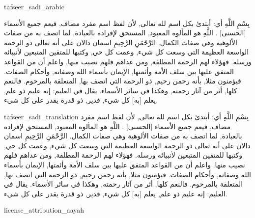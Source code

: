 \begin{taggedblock}{tafseer_sadi_arabic}
\begin{Arabic}
{ بِسْمِ اللَّهِ }
أي: أبتدئ بكل اسم لله تعالى, لأن لفظ
{ اسم }
مفرد مضاف, فيعم جميع الأسماء
[الحسنى]
.
{ اللَّهِ }
هو المألوه المعبود, المستحق لإفراده بالعبادة, لما اتصف به من صفات الألوهية وهي صفات الكمال.
{ الرَّحْمَنِ الرَّحِيمِ }
اسمان دالان على أنه تعالى ذو الرحمة الواسعة العظيمة التي وسعت كل شيء, وعمت كل حي, وكتبها للمتقين المتبعين لأنبيائه ورسله. فهؤلاء لهم الرحمة المطلقة, ومن عداهم فلهم نصيب منها. واعلم أن من القواعد المتفق عليها بين سلف الأمة وأئمتها, الإيمان بأسماء الله وصفاته, وأحكام الصفات. فيؤمنون مثلا, بأنه رحمن رحيم, ذو الرحمة التي اتصف بها, المتعلقة بالمرحوم. فالنعم كلها, أثر من آثار رحمته, وهكذا في سائر الأسماء. يقال في العليم: إنه عليم ذو علم, يعلم
[به]
كل شيء, قدير, ذو قدرة يقدر على كل شيء.
\end{Arabic}
\end{taggedblock}
\begin{taggedblock}{tafseer_sadi_translation}
{ بِسْمِ اللَّهِ }
أي: أبتدئ بكل اسم لله تعالى, لأن لفظ
{ اسم }
مفرد مضاف, فيعم جميع الأسماء
[الحسنى]
.
{ اللَّهِ }
هو المألوه المعبود, المستحق لإفراده بالعبادة, لما اتصف به من صفات الألوهية وهي صفات الكمال.
{ الرَّحْمَنِ الرَّحِيمِ }
اسمان دالان على أنه تعالى ذو الرحمة الواسعة العظيمة التي وسعت كل شيء, وعمت كل حي, وكتبها للمتقين المتبعين لأنبيائه ورسله. فهؤلاء لهم الرحمة المطلقة, ومن عداهم فلهم نصيب منها. واعلم أن من القواعد المتفق عليها بين سلف الأمة وأئمتها, الإيمان بأسماء الله وصفاته, وأحكام الصفات. فيؤمنون مثلا, بأنه رحمن رحيم, ذو الرحمة التي اتصف بها, المتعلقة بالمرحوم. فالنعم كلها, أثر من آثار رحمته, وهكذا في سائر الأسماء. يقال في العليم: إنه عليم ذو علم, يعلم
[به]
كل شيء, قدير, ذو قدرة يقدر على كل شيء.
\end{taggedblock}
\begin{taggedblock}{license_attribution_aayah}

\end{taggedblock}
\begin{comment}
Please use the following for footnotes:- Sample\footnoteQ{Text of Qur'an footnote goes here.}.
Sample\footnoteT{Text of Tafseer footnote goes here.}.
\end{comment}